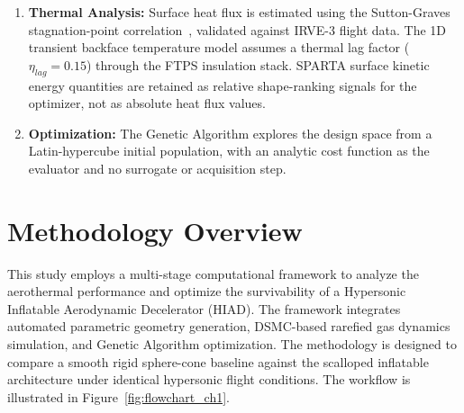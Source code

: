 \begin{enumerate}
    \item \textbf{Thermal Analysis:} Surface heat flux is estimated using the Sutton-Graves stagnation-point correlation~\cite{sutton1971gravesh}, validated against IRVE-3 flight data. The 1D transient backface temperature model assumes a thermal lag factor ($\eta_{lag} = 0.15$) through the FTPS insulation stack. SPARTA surface kinetic energy quantities are retained as relative shape-ranking signals for the optimizer, not as absolute heat flux values.

    \item \textbf{Optimization:} The Genetic Algorithm explores the design space from a Latin-hypercube initial population, with an analytic cost function as the evaluator and no surrogate or acquisition step.
\end{enumerate}

\section{Methodology Overview}
This study employs a multi-stage computational framework to analyze the aerothermal performance and optimize the survivability of a Hypersonic Inflatable Aerodynamic Decelerator (HIAD). The framework integrates automated parametric geometry generation, DSMC-based rarefied gas dynamics simulation, and Genetic Algorithm optimization. The methodology is designed to compare a smooth rigid sphere-cone baseline against the scalloped inflatable architecture under identical hypersonic flight conditions. The workflow is illustrated in Figure~\ref{fig:flowchart_ch1}.

